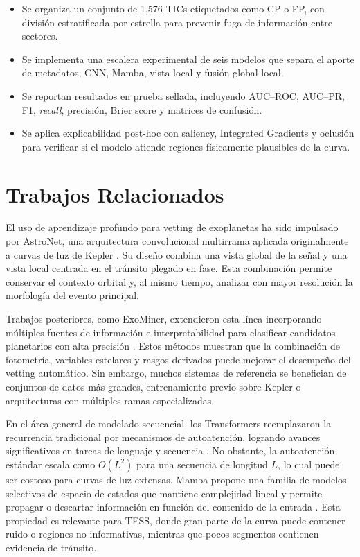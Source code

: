 \documentclass[conference]{IEEEtran}
\newcommand{\aucroc}{AUC--ROC}
\newcommand{\aucpr}{AUC--PR}
\begin{document}
\begin{itemize}
    \item Se organiza un conjunto de 1,576 TICs etiquetados como CP o FP, con división estratificada por estrella para prevenir fuga de información entre sectores.
    \item Se implementa una escalera experimental de seis modelos que separa el aporte de metadatos, CNN, Mamba, vista local y fusión global-local.
    \item Se reportan resultados en prueba sellada, incluyendo \aucroc{}, \aucpr{}, F1, \textit{recall}, precisión, Brier score y matrices de confusión.
    \item Se aplica explicabilidad post-hoc con saliency, Integrated Gradients y oclusión para verificar si el modelo atiende regiones físicamente plausibles de la curva.
\end{itemize}

\section{Trabajos Relacionados}

El uso de aprendizaje profundo para vetting de exoplanetas ha sido impulsado por AstroNet, una arquitectura convolucional multirrama aplicada originalmente a curvas de luz de Kepler \cite{shallue2018astronet}. Su diseño combina una vista global de la señal y una vista local centrada en el tránsito plegado en fase. Esta combinación permite conservar el contexto orbital y, al mismo tiempo, analizar con mayor resolución la morfología del evento principal.

Trabajos posteriores, como ExoMiner, extendieron esta línea incorporando múltiples fuentes de información e interpretabilidad para clasificar candidatos planetarios con alta precisión \cite{valizadegan2022exominer}. Estos métodos muestran que la combinación de fotometría, variables estelares y rasgos derivados puede mejorar el desempeño del vetting automático. Sin embargo, muchos sistemas de referencia se benefician de conjuntos de datos más grandes, entrenamiento previo sobre Kepler o arquitecturas con múltiples ramas especializadas.

En el área general de modelado secuencial, los Transformers reemplazaron la recurrencia tradicional por mecanismos de autoatención, logrando avances significativos en tareas de lenguaje y secuencia \cite{vaswani2017attention}. No obstante, la autoatención estándar escala como $O(L^2)$ para una secuencia de longitud $L$, lo cual puede ser costoso para curvas de luz extensas. Mamba propone una familia de modelos selectivos de espacio de estados que mantiene complejidad lineal y permite propagar o descartar información en función del contenido de la entrada \cite{gu2023mamba}. Esta propiedad es relevante para TESS, donde gran parte de la curva puede contener ruido o regiones no informativas, mientras que pocos segmentos contienen evidencia de tránsito.
\end{document}
